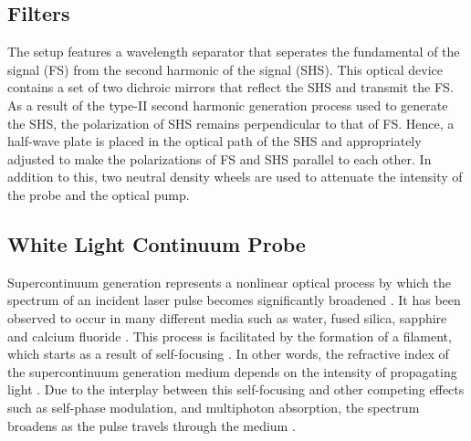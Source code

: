 \subsection{Filters}

The setup features a wavelength separator that seperates the fundamental of the signal (FS) from the second harmonic of the signal (SHS). This optical device contains a set of two dichroic mirrors that reflect the SHS and transmit the FS. As a result of the type-II second harmonic generation process used to generate the SHS, the polarization of SHS remains perpendicular to that of FS. Hence, a half-wave plate is placed in the optical path of the SHS and appropriately adjusted to make the polarizations of FS and SHS parallel to each other. In addition to this, two neutral density wheels are used to attenuate the intensity of the probe and the optical pump.

\subsection{White Light Continuum Probe}

\label{section:white_light_probe}
Supercontinuum generation represents a nonlinear optical process by which the spectrum of an incident laser pulse becomes significantly broadened \cite{alfano1970emission, alfano1970observation, alfano1989supercontinuum, dubietis2017ultrafast}. It has been observed to occur in many different media such as water, fused silica, sapphire and calcium fluoride \cite{alfano1989supercontinuum, dubietis2017ultrafast}. This process is facilitated by the formation of a filament, which starts as a result of self-focusing \cite{alfano1989supercontinuum, dubietis2017ultrafast}. In other words, the refractive index of the supercontinuum generation medium depends on the intensity of propagating light \cite{alfano1989supercontinuum, dubietis2017ultrafast}. Due to the interplay between this self-focusing and other competing effects such as self-phase modulation, and multiphoton absorption, the spectrum  broadens as the pulse travels through the medium \cite{alfano1989supercontinuum, dubietis2017ultrafast}.

